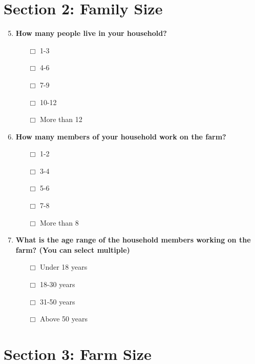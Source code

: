 \documentclass[12pt]{article}
\begin{document}
\section*{Section 2: Family Size}

\begin{enumerate}[label=\arabic*.]
    \setcounter{enumi}{4}
    \item \textbf{How many people live in your household?}
    \begin{itemize}
        \item [$\Box$] 1-3
        \item [$\Box$] 4-6
        \item [$\Box$] 7-9
        \item [$\Box$] 10-12
        \item [$\Box$] More than 12
    \end{itemize}
    \item \textbf{How many members of your household work on the farm?}
    \begin{itemize}
        \item [$\Box$] 1-2
        \item [$\Box$] 3-4
        \item [$\Box$] 5-6
        \item [$\Box$] 7-8
        \item [$\Box$] More than 8
    \end{itemize}
    \item \textbf{What is the age range of the household members working on the farm? (You can select multiple)}
    \begin{itemize}
        \item [$\Box$] Under 18 years
        \item [$\Box$] 18-30 years
        \item [$\Box$] 31-50 years
        \item [$\Box$] Above 50 years
    \end{itemize}
\end{enumerate}

\section*{Section 3: Farm Size}
\end{document}
